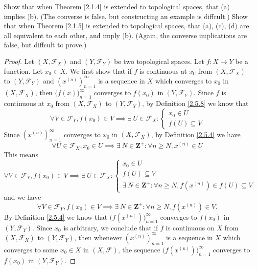 \begin{exercise}\label{ex 2.5.16}
    Show that when Theorem \ref{2.1.4} is extended to topological spaces, that (a) implies (b).
    (The converse is false, but constructing an example is diffcult.)
    Show that when Theorem \ref{2.1.5} is extended to topological spaces, that (a), (c), (d) are all equivalent to each other, and imply (b).
    (Again, the converse implications are false, but diffcult to prove.)
\end{exercise}

\begin{proof}
    Let \((X, \mathcal{F}_X)\) and \((Y, \mathcal{F}_Y)\) be two topological spaces.
    Let \(f : X \to Y\) be a function.
    Let \(x_0 \in X\).
    We first show that if \(f\) is continuous at \(x_0\) from \((X, \mathcal{F}_X)\) to \((Y, \mathcal{F}_Y)\) and \((x^{(n)})_{n = 1}^\infty\) is a sequence in \(X\) which converges to \(x_0\) in \((X, \mathcal{F}_X)\), then \(\big(f(x)\big)_{n = 1}^\infty\) converges to \(f(x_0)\) in \((Y, \mathcal{F}_Y)\).
    Since \(f\) is continuous at \(x_0\) from \((X, \mathcal{F}_X)\) to \((Y, \mathcal{F}_Y)\), by Definition \ref{2.5.8} we know that
    \[
        \forall V \in \mathcal{F}_Y, f(x_0) \in V \implies \exists\ U \in \mathcal{F}_X : \begin{cases}
            x_0 \in U \\
            f(U) \subseteq V
        \end{cases}
    \]
    Since \((x^{(n)})_{n = 1}^\infty\) converges to \(x_0\) in \((X, \mathcal{F}_X)\), by Definition \ref{2.5.4} we have
    \[
        \forall U \in \mathcal{F}_X, x_0 \in U \implies \exists\ N \in \mathbf{Z}^+ : \forall n \geq N, x^{(n)} \in U
    \]
    This means
    \[
        \forall V \in \mathcal{F}_Y, f(x_0) \in V \implies \exists\ U \in \mathcal{F}_X : \begin{cases}
            x_0 \in U        \\
            f(U) \subseteq V \\
            \exists\ N \in \mathbf{Z}^+ : \forall n \geq N, f(x^{(n)}) \in f(U) \subseteq V
        \end{cases}
    \]
    and we have
    \[
        \forall V \in \mathcal{F}_Y, f(x_0) \in V \implies \exists\ N \in \mathbf{Z}^+ : \forall n \geq N, f(x^{(n)}) \in V.
    \]
    By Definition \ref{2.5.4} we know that \(\big(f(x^{(n)})\big)_{n = 1}^\infty\) converges to \(f(x_0)\) in \((Y, \mathcal{F}_Y)\).
    Since \(x_0\) is arbitrary, we conclude that if \(f\) is continuous on \(X\) from \((X, \mathcal{F}_X)\) to \((Y, \mathcal{F}_Y)\), then whenever \((x^{(n)})_{n = 1}^\infty\) is a sequence in \(X\) which converges to some \(x_0 \in X\) in \((X, \mathcal{F})\), the sequence \(\big(f(x^{(n)})\big)_{n = 1}^\infty\) converges to \(f(x_0)\) in \((Y, \mathcal{F}_Y)\).


\end{proof}
